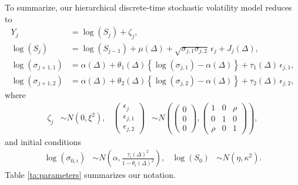 To summarize, our hierarchical discrete-time stochastic volatility model reduces to
\begin{align}
  Y_j &= \log(S_j) + \zeta_j  ,   \label{eq:mod1}   \\
  \log(S_{j}) &= \log(S_{j-1}) + \mu(\Delta) + \sqrt{\sigma_{j,1}\sigma_{j,2}} \, \epsilon_{j} + J_j(\Delta)   ,  \label{eq:mod2}  \\
  \log(\sigma_{j+1,1}) &= \alpha(\Delta) + \theta_1(\Delta) \left\{ \log(\sigma_{j,1}) - \alpha(\Delta) \right\} + \tau_1(\Delta) \, \epsilon_{j,1}    ,  \label{eq:mod3}  \\
  \log(\sigma_{j+1,2}) &= \alpha(\Delta) + \theta_2(\Delta) \left\{ \log(\sigma_{j,2}) - \alpha(\Delta) \right\} + \tau_2(\Delta) \, \epsilon_{j,2}    , \label{eq:mod4}
\end{align}
where
\begin{align*}
  \zeta_j &\sim N(0, \xi^2)  ,  &
                                  \left( \begin{matrix} \epsilon_{j} \\
      \epsilon_{j,1} \\ \epsilon_{j,2} \end{matrix} \right) &\sim
                                            N \left( \left(\begin{matrix} 0 \\ 0 \\
	                                          0 \end{matrix}
                                              \right) ,
  \left( \begin{matrix} 1 & 0 & \rho \\
      0 & 1 & 0 \\
    \rho & 0 & 1 \end{matrix} \right) \right)  ,
\end{align*}
and initial conditions
\begin{align*}
  \log(\sigma_{0,i}) & \sim N \left( \alpha , \frac{\tau_i(\Delta)^2}{1 - \theta_i(\Delta)^2} \right)  ,  &   \log(S_0) & \sim N \left( \eta, \kappa^2 \right)  .
\end{align*}
Table \ref{ta:parameters} summarizes our notation.
%
